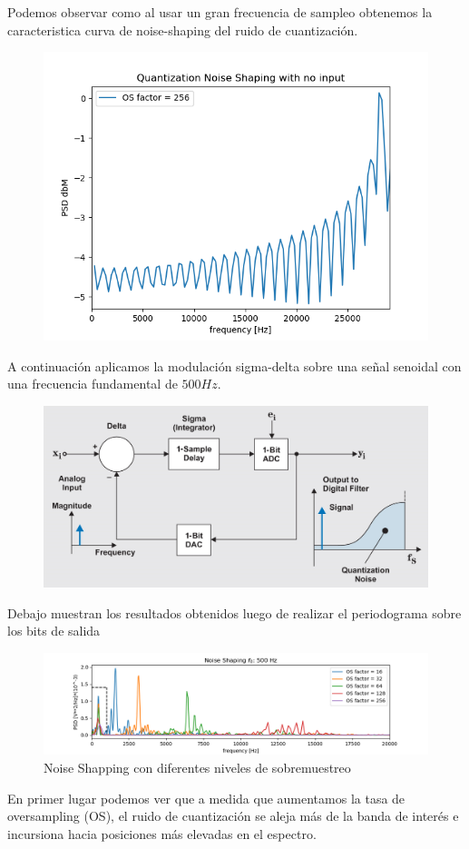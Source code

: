 Podemos observar como al usar un gran frecuencia de sampleo obtenemos la caracteristica curva de noise-shaping del ruido de cuantización.
\begin{figure}[H]
	\centering
	\includegraphics[width=0.7\linewidth]{ImagenesEjercicio2/QnoiseNoInput}
	\caption{}
	\label{fig:qnoisenoinput}
\end{figure}


A continuación aplicamos la modulación sigma-delta sobre una señal senoidal con una frecuencia fundamental de $500Hz$. 
\begin{figure}[H]
	\centering
	\includegraphics[width=0.7\linewidth]{ImagenesEjercicio2/NoiseShapingFullsche}
	\caption{}
	\label{fig:noiseshapingfullsche}
\end{figure}



Debajo muestran los resultados obtenidos luego de realizar el periodograma sobre los bits de salida

\begin{figure}[H]
	\centering
	\includegraphics[width=\linewidth]{ImagenesEjercicio2/NoiseShappingDemo1zoom2solid.png}
	\caption{Noise Shapping con diferentes niveles de sobremuestreo}
	\label{fig:noiseshappingdemo1}
\end{figure}
En primer lugar podemos ver que a medida que aumentamos la tasa de oversampling (OS), el ruido de cuantización se aleja más de la banda de interés e incursiona hacia posiciones más elevadas en el espectro.

